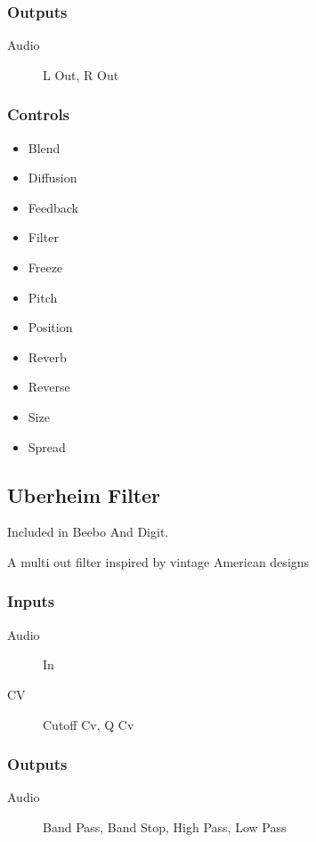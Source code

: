 \subsubsection{Outputs}
\begin{description}
\item [Audio] L Out, R Out
\end{description}

\subsubsection{Controls}
\begin{itemize}
\item Blend
\item Diffusion
\item Feedback
\item Filter
\item Freeze
\item Pitch
\item Position
\item Reverb
\item Reverse
\item Size
\item Spread
\end{itemize}

\subsection{Uberheim Filter}

Included in Beebo And Digit.

A multi out filter inspired by vintage American designs



\subsubsection{Inputs}
\begin{description}
\item [Audio] In
\item [CV] Cutoff Cv, Q Cv
\end{description}

\subsubsection{Outputs}
\begin{description}
\item [Audio] Band Pass, Band Stop, High Pass, Low Pass
\end{description}

